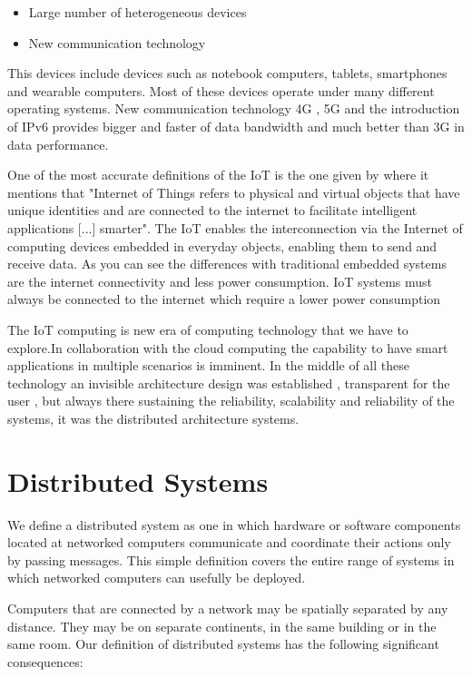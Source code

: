 \begin{itemize}
\item Large number of heterogeneous devices
\item New communication technology
\end{itemize}

This  devices include devices such as notebook computers, tablets, smartphones
and wearable computers. Most of these devices operate under many different
operating systems. New communication technology 4G , 5G and the introduction of
IPv6 provides bigger and faster of data bandwidth and much better than 3G in
data performance.

One of the most accurate definitions of the IoT is the one given by
\cite{Bahga} where it mentions that "Internet of Things refers to physical and
virtual objects that have unique identities and are connected to the internet
to facilitate intelligent applications [...] smarter". The IoT enables the
interconnection via the Internet of computing devices embedded in everyday
objects, enabling them to send and receive data. As you can see the differences
with traditional embedded systems are the internet connectivity and less power
consumption.  IoT systems must always be connected to the internet which
require a lower power consumption

The IoT computing is new era of computing technology that we have to explore.In
collaboration with the cloud computing the capability to have smart
applications in multiple scenarios is imminent. In the middle of all these
technology an invisible architecture design was established , transparent for
the user , but always there sustaining the reliability, scalability and
reliability of the systems, it was the distributed architecture systems.

\section{Distributed Systems}
\noindent

We define a distributed system as one in which hardware or software components
located at networked computers communicate and coordinate their actions only by
passing messages. This simple definition covers the entire range of systems in
which networked computers can usefully be deployed.

Computers that are connected by a network may be spatially separated by any
distance. They may be on separate continents, in the same building or in the
same room. Our definition of distributed systems has the following significant
consequences:



